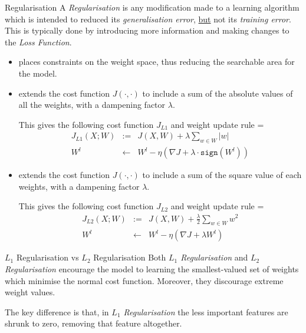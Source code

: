 \documentclass[11pt,a4paper]{article}
\begin{document}
  \begin{definition}{Regularisation}
    A \textit{Regularisation} is any modification made to a learning algorithm which is intended to reduced its \textit{generalisation error}, \underline{but} not its \textit{training error}. This is typically done by introducing more information and making changes to the \textit{Loss Function}.
    \begin{itemize}
      \item[\textit{$L$-Regularisation}] places constraints on the weight space, thus reducing the searchable area for the model.
      \item[\textit{$L_1$-Regularisation}] extends the cost function $J(\cdot,\cdot)$ to include a sum of the absolute values of all the weights, with a dampening factor $\lambda$.
      \par This gives the following cost function $J_{L1}$ and weight update rule
      \everymath={\displaystyle}
      \[\begin{array}{rrl}
        J_{L1}(X;W)&:=&J(X,W)+\lambda\sum_{w\in W}|w|\\
        W^l&\leftarrow&W^l-\eta\left(\nabla J+\lambda\cdot\mathtt{sign}(W^l)\right)
      \end{array}\]
      \item[\textit{$L_2$-Regularisation}] extends the cost function $J(\cdot,\cdot)$ to include a sum of the square value of each weights, with a dampening factor $\lambda$.
      \par This gives the following cost function $J_{L2}$ and weight update rule
      \everymath={\displaystyle}
      \[\begin{array}{rrl}
        J_{L2}(X;W)&:=&J(X,W)+\frac\lambda2\sum_{w\in W}w^2\\
        W^l&\leftarrow&W^l-\eta\left(\nabla J+\lambda W^l\right)
      \end{array}\]
    \end{itemize}
  \end{definition}

  \begin{remark}{$L_1$ Regularisation vs $L_2$ Regularisation}
    Both \textit{$L_1$ Regularisation} and \textit{$L_2$ Regularisation} encourage the model to learning the smallest-valued set of weights which minimise the normal cost function. Moreover, they discourage extreme weight values.
    \par The key difference is that, in \textit{$L_1$ Regularisation} the less important features are shrunk to zero, removing that feature altogether.
  \end{remark}
\end{document}
